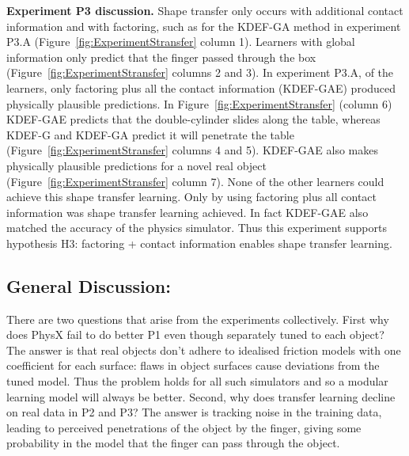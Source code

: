 {\bf Experiment P3 discussion.} Shape transfer only occurs with additional contact information and with factoring, such as for the
KDEF-GA method in experiment P3.A (Figure~\ref{fig:ExperimentStransfer} column 1).  Learners with global information only predict that the finger passed  through the box (Figure~\ref{fig:ExperimentStransfer} columns 2 and 3). In experiment P3.A, of the learners, only factoring plus all the contact information (KDEF-GAE) produced physically plausible predictions. In Figure~\ref{fig:ExperimentStransfer} (column 6) KDEF-GAE predicts that the double-cylinder slides along the table, whereas KDEF-G and KDEF-GA predict it will penetrate the table (Figure~\ref{fig:ExperimentStransfer} columns 4 and 5). KDEF-GAE also makes physically plausible predictions for a novel real object 
(Figure~\ref{fig:ExperimentStransfer} column 7). None of the other learners could achieve this shape transfer learning. Only by using factoring plus all contact information was shape transfer learning achieved. In fact KDEF-GAE also matched the accuracy of the physics simulator. Thus this experiment supports hypothesis H3: factoring + contact information enables shape transfer learning.

\subsection{General Discussion:} There are two questions that arise from the experiments collectively. First why does PhysX fail to do better P1 even though separately tuned to each object? The answer is that real objects don't adhere to idealised friction models with one coefficient for each surface: flaws in object surfaces cause deviations from the tuned model. Thus the problem holds for all such simulators and so a modular learning model will always be better. Second, why does transfer learning decline on real data in P2 and P3? The answer is tracking noise in the training data, leading to perceived penetrations of the object by the finger, giving some probability in the model that the finger can pass through the object. 







